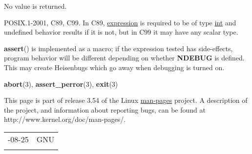 \documentclass[]{article}
\let\realtextbf=\textbf
\renewcommand{\textbf}[1]{\textcolor{boldcolor}{\realtextbf{#1}}}
\renewcommand{\emph}[1]{\underline{#1}}
\begin{document}
No value is returned.


POSIX.1-2001, C89, C99. In C89, \emph{expression} is required to be of
type \emph{int} and undefined behavior results if it is not, but in C99
it may have any scalar type.


\textbf{assert}() is implemented as a macro; if the expression tested
has side-effects, program behavior will be different depending on
whether \textbf{NDEBUG} is defined. This may create Heisenbugs which go
away when debugging is turned on.


\textbf{abort}(3), \textbf{assert\_perror}(3), \textbf{exit}(3)


This page is part of release 3.54 of the Linux \emph{man-pages} project.
A description of the project, and information about reporting bugs, can
be found at http://www.kernel.org/doc/man-pages/.

\begin{longtable}[c]{@{}ll@{}}
\toprule\addlinespace
2002-08-25 & GNU
\\\addlinespace
\bottomrule
\end{longtable}
\end{document}

